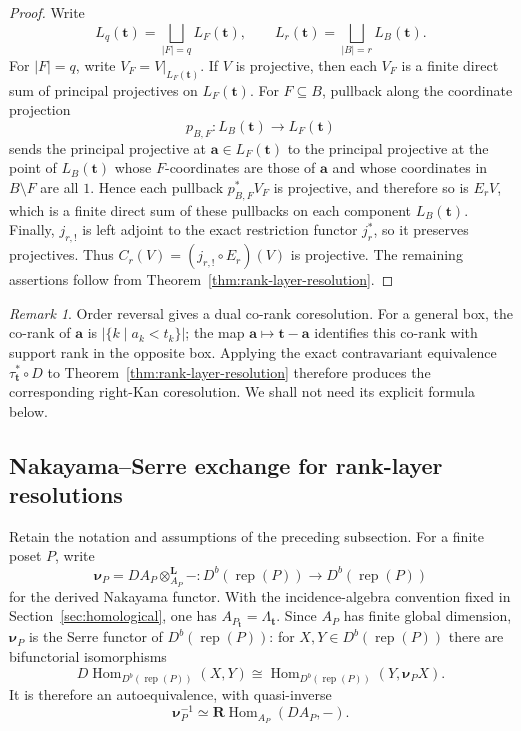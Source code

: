 \documentclass[12pt,reqno]{amsart}
\theoremstyle{definition}
\theoremstyle{remark}
\newtheorem{remark}[theorem]{Remark}
\newcommand{\Rep}{\operatorname{rep}}
\newcommand{\Hom}{\operatorname{Hom}}
\begin{document}
\begin{proof}
Write
\[
L_q(\mathbf t)=\bigsqcup_{|F|=q}L_F(\mathbf t),
\qquad
L_r(\mathbf t)=\bigsqcup_{|B|=r}L_B(\mathbf t).
\]
For $|F|=q$, write $V_F=V|_{L_F(\mathbf t)}$.  If $V$ is projective, then
each $V_F$ is a finite direct sum of principal projectives on
$L_F(\mathbf t)$.  For $F\subseteq B$, pullback along
the coordinate projection
\[
p_{B,F}:L_B(\mathbf t)\longrightarrow L_F(\mathbf t)
\]
sends the principal projective at $\mathbf a\in L_F(\mathbf t)$ to the
principal projective at the point of $L_B(\mathbf t)$ whose $F$-coordinates
are those of $\mathbf a$ and whose coordinates in $B\setminus F$ are all
$1$.  Hence each pullback $p_{B,F}^*V_F$ is projective, and therefore so is
$E_rV$, which is a finite direct sum of these pullbacks on each component
$L_B(\mathbf t)$.  Finally, $j_{r,!}$ is left adjoint to the exact restriction
functor $j_r^*$, so it preserves projectives.  Thus
$C_r(V)=(j_{r,!}\circ E_r)(V)$ is projective.  The remaining assertions follow from
Theorem~\ref{thm:rank-layer-resolution}.
\end{proof}

\begin{remark}\label{rem:dual-rank-resolution}
Order reversal gives a dual co-rank coresolution.  For a general box, the
co-rank of $\mathbf a$ is $|\{k\mid a_k<t_k\}|$; the map
$\mathbf a\mapsto\mathbf t-\mathbf a$ identifies this co-rank with support
rank in the opposite box.  Applying the exact contravariant equivalence
$\tau_{\mathbf t}^*\circ D$ to Theorem~\ref{thm:rank-layer-resolution} therefore
produces the corresponding right-Kan coresolution.  We shall not need its
explicit formula below.
\end{remark}

\subsection{Nakayama--Serre exchange for rank-layer resolutions}\label{subsec:higher-nakayama}

Retain the notation and assumptions of the preceding subsection.  For a
finite poset $P$, write
\[
\boldsymbol\nu_P
=
DA_P\otimes_{A_P}^{\mathbf L}-
:
D^b(\Rep(P))\longrightarrow D^b(\Rep(P))
\]
for the derived Nakayama functor.  With the incidence-algebra convention fixed
in Section~\ref{sec:homological}, one has $A_{P_{\mathbf t}}=\Lambda_{\mathbf t}$.
Since $A_P$ has finite global dimension, $\boldsymbol\nu_P$ is the Serre
functor of $D^b(\Rep(P))$: for $X,Y\in D^b(\Rep(P))$ there are bifunctorial
isomorphisms
\[
D\Hom_{D^b(\Rep(P))}(X,Y)
\cong
\Hom_{D^b(\Rep(P))}(Y,\boldsymbol\nu_P X).
\]
It is therefore an autoequivalence, with quasi-inverse
\[
\boldsymbol\nu_P^{-1}
\simeq
\mathbf R\Hom_{A_P}(DA_P,-).
\]
\end{document}
